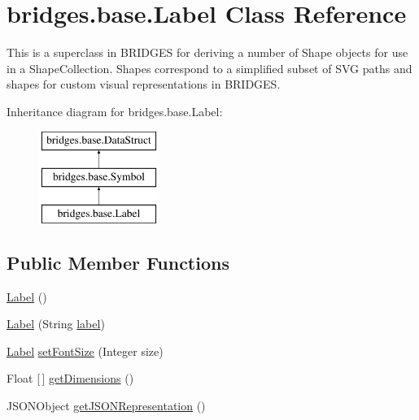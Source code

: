 \hypertarget{classbridges_1_1base_1_1_label}{}\section{bridges.\+base.\+Label Class Reference}
\label{classbridges_1_1base_1_1_label}


This is a superclass in B\+R\+I\+D\+G\+ES for deriving a number of Shape objects for use in a Shape\+Collection. Shapes correspond to a simplified subset of S\+VG paths and shapes for custom visual representations in B\+R\+I\+D\+G\+ES.  


Inheritance diagram for bridges.\+base.\+Label\+:\begin{figure}[H]
\begin{center}
\leavevmode
\includegraphics[height=3.000000cm]{classbridges_1_1base_1_1_label}
\end{center}
\end{figure}
\subsection*{Public Member Functions}
\begin{DoxyCompactItemize}
\item 
\mbox{\hyperlink{classbridges_1_1base_1_1_label_adaed1c29dc02eb0f77d772b256b9eae4}{Label}} ()
\item 
\mbox{\hyperlink{classbridges_1_1base_1_1_label_a0ffb2cdafae3f2c21e0925f2fe23df87}{Label}} (String \mbox{\hyperlink{classbridges_1_1base_1_1_symbol_ad2adcc82e6a96c2f3c465702502655e9}{label}})
\item 
\mbox{\hyperlink{classbridges_1_1base_1_1_label}{Label}} \mbox{\hyperlink{classbridges_1_1base_1_1_label_ab5f2d60e519db2499f326c4ccb967b25}{set\+Font\+Size}} (Integer size)
\item 
Float \mbox{[}$\,$\mbox{]} \mbox{\hyperlink{classbridges_1_1base_1_1_label_a9df9f801df020ba601a7bd33f38b4b0f}{get\+Dimensions}} ()
\item 
J\+S\+O\+N\+Object \mbox{\hyperlink{classbridges_1_1base_1_1_label_a6befc6655ce36868213be289571c6315}{get\+J\+S\+O\+N\+Representation}} ()
\end{DoxyCompactItemize}
